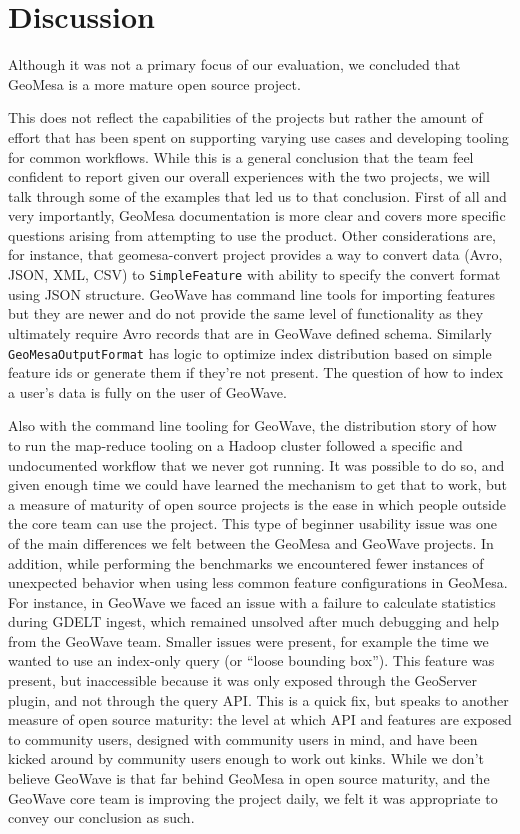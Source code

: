 \section{Discussion}
\label{sec:subjective}

Although it was not a primary focus of our evaluation, we concluded that GeoMesa is a more mature open source project.

This does not reflect the capabilities of the projects but rather the amount of effort that has been spent on supporting varying use cases and developing tooling for common workflows.
While this is a general conclusion that the team feel confident to report given our overall experiences with the two projects, we will talk through some of the examples that led us to that conclusion.
First of all and very importantly, GeoMesa documentation is more clear and covers more specific questions arising from attempting to use the product.
Other considerations are, for instance, that geomesa-convert project provides a way to convert data (Avro, JSON, XML, CSV) to \texttt{SimpleFeature} with ability to specify the convert format using JSON structure.
GeoWave has command line tools for importing features but they are newer and do not provide the same level of functionality as they ultimately require Avro records that are in GeoWave defined schema.
Similarly \texttt{GeoMesaOutputFormat} has logic to optimize index distribution based on simple feature ids or generate them if they're not present.
The question of how to index a user’s data is fully on the user of GeoWave.

Also with the command line tooling for GeoWave, the distribution story of how to run the map-reduce tooling on a Hadoop cluster followed a specific and undocumented workflow that we never got running.
It was possible to do so, and given enough time we could have learned the mechanism to get that to work, but a measure of maturity of open source projects is the ease in which people outside the core team can use the project.
This type of beginner usability issue was one of the main differences we felt between the GeoMesa and GeoWave projects.
In addition, while performing the benchmarks we encountered fewer instances of unexpected behavior when using less common feature configurations in GeoMesa.
For instance, in GeoWave we faced an issue with a failure to calculate statistics during GDELT ingest, which remained unsolved after much debugging and help from the GeoWave team.
Smaller issues were present, for example the time we wanted to use an index-only query (or ``loose bounding box'').
This feature was present, but inaccessible because it was only exposed through the GeoServer plugin, and not through the query API.
This is a quick fix, but speaks to another measure of open source maturity: the level at which API and features are exposed to community users, designed with community users in mind, and have been kicked around by community users enough to work out kinks.
While we don’t believe GeoWave is that far behind GeoMesa in open source maturity, and the GeoWave core team is improving the project daily, we felt it was appropriate to convey our conclusion as such.

